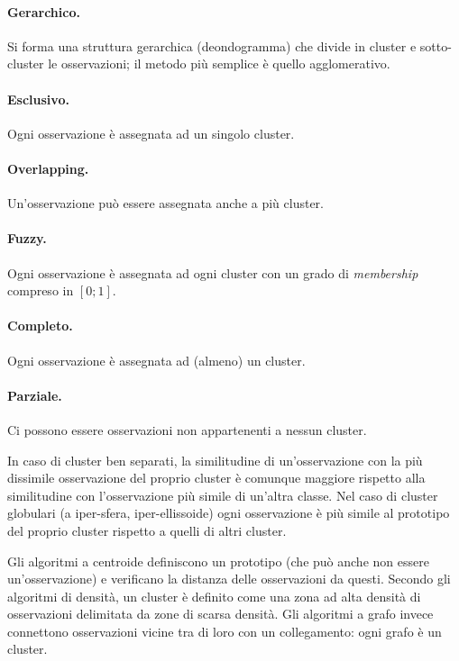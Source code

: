 \documentclass[11pt, a4page, twocolumn]{article}
\begin{document}
\paragraph{Gerarchico.}
Si forma una struttura gerarchica (deondogramma) che divide in cluster e sotto-cluster le osservazioni; il metodo più semplice è quello agglomerativo.

\paragraph{Esclusivo.}
Ogni osservazione è assegnata ad un singolo cluster.
\paragraph{Overlapping.}
Un'osservazione può essere assegnata anche a più cluster.
\paragraph{Fuzzy.}
Ogni osservazione è assegnata ad ogni cluster con un grado di \textit{membership} compreso in $[0;1]$.

\paragraph{Completo.}
Ogni osservazione è assegnata ad (almeno) un cluster.
\paragraph{Parziale.}
Ci possono essere osservazioni non appartenenti a nessun cluster. \newline

In caso di cluster ben separati, la similitudine di un'osservazione con la più dissimile osservazione del proprio cluster è comunque maggiore rispetto alla similitudine con l'osservazione più simile di un'altra classe.
Nel caso di cluster globulari (a iper-sfera, iper-ellissoide) ogni osservazione è più simile al prototipo del proprio cluster rispetto a quelli di altri cluster.

Gli algoritmi a centroide definiscono un prototipo (che può anche non essere un'osservazione) e verificano la distanza delle osservazioni da questi.
Secondo gli algoritmi di densità, un cluster è definito come una zona ad alta densità di osservazioni delimitata da zone di scarsa densità.
Gli algoritmi a grafo invece connettono osservazioni vicine tra di loro con un collegamento: ogni grafo è un cluster. \newline
\end{document}
